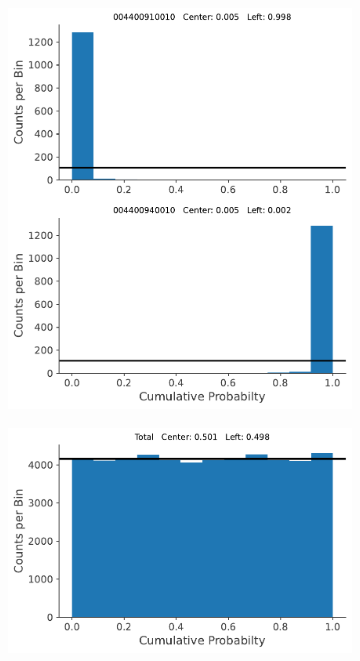 \documentclass{report}
\begin{document}
\begin{figure}[h]
  \centering
  \begin{subfigure}{0.5\textwidth}
    \centering
    \includegraphics[width=0.9\linewidth]{Images/PPC_and_Background_Analysis/004400910010_004400940010_cdf.pdf}
  \end{subfigure}%
  \begin{subfigure}{.5\textwidth}
    \centering
    \includegraphics[width=.9\linewidth]{Images/PPC_and_Background_Analysis/Total_cdf.pdf}
  \end{subfigure}
  \caption{}
  \label{}
\end{figure}
\end{document}
